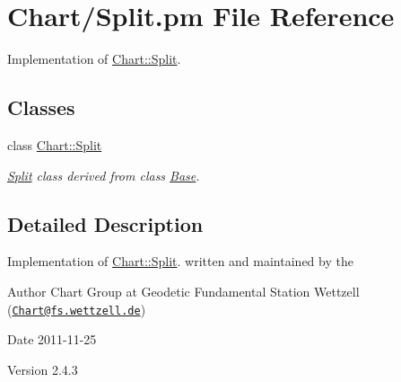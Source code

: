 \hypertarget{Split_8pm}{
\section{Chart/Split.pm File Reference}
\label{Split_8pm}
}


Implementation of \hyperlink{classChart_1_1Split}{Chart::Split}.  


\subsection*{Classes}
\begin{DoxyCompactItemize}
\item 
class \hyperlink{classChart_1_1Split}{Chart::Split}
\begin{DoxyCompactList}\small\item\em \hyperlink{classChart_1_1Split}{Split} class derived from class \hyperlink{classChart_1_1Base}{Base}. \item\end{DoxyCompactList}\end{DoxyCompactItemize}


\subsection{Detailed Description}
Implementation of \hyperlink{classChart_1_1Split}{Chart::Split}. written and maintained by the \begin{DoxyAuthor}{Author}
Chart Group at Geodetic Fundamental Station Wettzell (\href{mailto:Chart@fs.wettzell.de}{\tt Chart@fs.wettzell.de}) 
\end{DoxyAuthor}
\begin{DoxyDate}{Date}
2011-\/11-\/25 
\end{DoxyDate}
\begin{DoxyVersion}{Version}
2.4.3 
\end{DoxyVersion}

